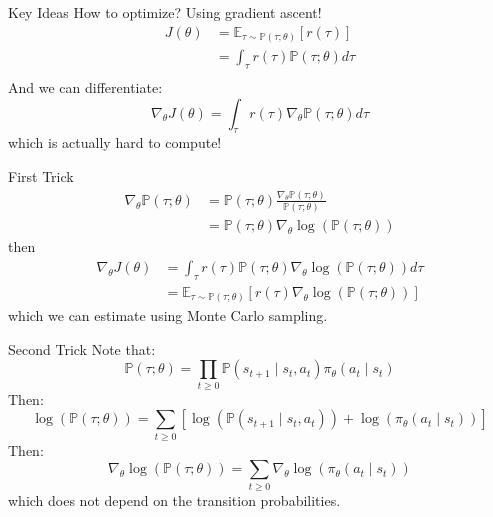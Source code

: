 \documentclass{beamer}
\begin{document}
	\begin{frame}
		\begin{block}{Key Ideas}
			How to optimize? Using gradient ascent!
			\begin{align*}
			J(\theta) &= \mathbb{E}_{\tau \sim \mathbb{P}(\tau ; \theta) } \left[ r(\tau) \right]\\
			&= \int_{\tau} r(\tau) \mathbb{P}(\tau ; \theta) d\tau \\
			\end{align*}
			And we can differentiate:
			$$ \nabla_\theta J(\theta) = \int_{\tau} r(\tau) \nabla_\theta \mathbb{P}(\tau ; \theta) d\tau $$
			which is actually hard to compute!
		\end{block}
	\end{frame}
	
	\begin{frame}
		\begin{block}{First Trick}
			\begin{align*}
			\nabla_\theta \mathbb{P}(\tau ; \theta) &= \mathbb{P}(\tau ; \theta) \frac{\nabla_\theta \mathbb{P}(\tau ; \theta)}{\mathbb{P}(\tau ; \theta)} \\
			&= \mathbb{P}(\tau ; \theta) \nabla_\theta \log \left( \mathbb{P}(\tau ; \theta) \right)
			\end{align*}
			then
			\begin{align*}
			\nabla_\theta J(\theta) &= \int_{\tau} r(\tau) \mathbb{P}(\tau ; \theta) \nabla_\theta \log \left( \mathbb{P}(\tau ; \theta) \right) d\tau \\
			&= \mathbb{E}_{\tau \sim \mathbb{P}(\tau ; \theta) } \left[ r(\tau) \nabla_\theta \log \left( \mathbb{P}(\tau ; \theta) \right) \right]
			\end{align*}
			which we can estimate using Monte Carlo sampling.
		\end{block}
	\end{frame}
	
	\begin{frame}
		\begin{block}{Second Trick}
			Note that:
			$$ \mathbb{P}(\tau ; \theta) = \prod_{t\geq0} \mathbb{P}(s_{t+1} \mid s_t, a_t) \pi_\theta (a_t \mid s_t) $$
			Then:
			$$ \log \left( \mathbb{P}(\tau ; \theta) \right) = \sum_{t\geq0} \left[  \log \left( \mathbb{P}(s_{t+1} \mid s_t, a_t) \right) + \log \left( \pi_\theta (a_t \mid s_t) \right) \right] $$
			Then:
			$$ \nabla_\theta \log \left( \mathbb{P}(\tau ; \theta) \right) = \sum_{t\geq0} \nabla_\theta \log \left( \pi_\theta (a_t \mid s_t) \right) $$
			which does not depend on the transition probabilities.
		\end{block}
	\end{frame}
	
\end{document}
